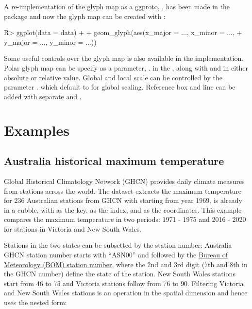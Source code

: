 \documentclass[
]{jss}
\begin{document}
A re-implementation of the glyph map as a ggproto, , has
been made in the  package and now the glyph map can be
created with :

\begin{CodeChunk}
\begin{CodeInput}
R> ggplot(data = data) +
+   geom_glyph(aes(x_major = ..., x_minor = ..., 
+                  y_major = ..., y_minor = ...))
\end{CodeInput}
\end{CodeChunk}

Some useful controls over the glyph map is also available in the
 implementation. Polar glyph map can be specify as a
parameter, . in the , along with
 and  in either absolute or relative value.
Global and local scale can be controlled by the parameter
. which default to  for global scaling.
Reference box and line can be added with separate
 and .

\hypertarget{examples}{%
\section{Examples}\label{examples}}

\hypertarget{australia-historical-maximum-temperature}{%
\subsection{Australia historical maximum
temperature}\label{australia-historical-maximum-temperature}}

Global Historical Climatology Network (GHCN) provides daily climate
measures from stations across the world. The dataset
 extracts the maximum temperature for
236 Australian stations from GHCN with starting from year 1969.
 is already in a cubble, with
 as the key,  as the index, and
 as the coordinates. This example compares
the maximum temperature in two periods: 1971 - 1975 and 2016 - 2020 for
stations in Victoria and New South Wales.

Stations in the two states can be subsetted by the station number:
Australia GHCN station number starts with ``ASN00'' and followed by the
\href{http://www.bom.gov.au/climate/cdo/about/site-num.shtml}{Bureau of
Meteorology (BOM) station number}, where the 2nd and 3rd digit (7th and
8th in the GHCN number) define the state of the station. New South Wales
stations start from 46 to 75 and Victoria stations follow from 76 to 90.
Filtering Victoria and New South Wales stations is an operation in the
spatial dimension and hence uses the nested form:
\end{document}
